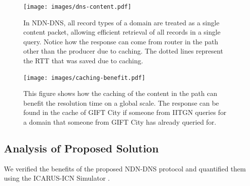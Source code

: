 \documentclass[conference]{IEEEtran}
\begin{document}
\begin{figure}[htbp]
    \centering
    \texttt{[image: images/dns-content.pdf]}
    \caption{In NDN-DNS, all record types of a domain are treated as a single content packet, allowing efficient retrieval of all records in a single query. Notice how the response can come from router in the path other than the producer due to caching. The dotted lines represent the RTT that was saved due to caching.} 
    \label{fig:dns-content}
\end{figure}

\begin{figure}[htbp]
    \centering
    \texttt{[image: images/caching-benefit.pdf]}
    \caption{This figure shows how the caching of the content in the path can benefit the resolution time on a global scale. The response can be found in the cache of GIFT City if someone from IITGN queries for a domain that someone from GIFT City has already queried for.}
    \label{fig:caching-benefit}
\end{figure}

\subsection{Analysis of Proposed Solution}
We verified the benefits of the proposed NDN-DNS protocol and quantified them using the ICARUS-ICN Simulator \cite{icarus-simutools14}.
\end{document}
